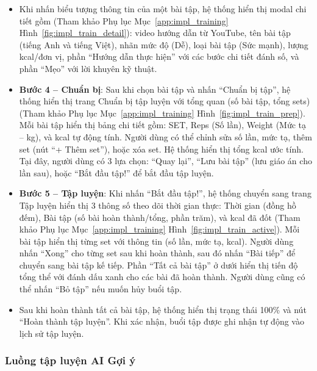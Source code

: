 \begin{itemize}
    \item Khi nhấn biểu tượng thông tin của một bài tập, hệ thống hiển thị modal chi tiết gồm (Tham khảo Phụ lục Mục~\ref{app:impl_training} Hình~\ref{fig:impl_train_detail}): video hướng dẫn từ YouTube, tên bài tập (tiếng Anh và tiếng Việt), nhãn mức độ (Dễ), loại bài tập (Sức mạnh), lượng kcal/đơn vị, phần ``Hướng dẫn thực hiện'' với các bước chi tiết đánh số, và phần ``Mẹo'' với lời khuyên kỹ thuật.


    \item \textbf{Bước 4 -- Chuẩn bị}: Sau khi chọn bài tập và nhấn ``Chuẩn bị tập'', hệ thống hiển thị trang Chuẩn bị tập luyện với tổng quan (số bài tập, tổng sets) (Tham khảo Phụ lục Mục~\ref{app:impl_training} Hình~\ref{fig:impl_train_prep}). Mỗi bài tập hiển thị bảng chi tiết gồm: SET, Reps (Số lần), Weight (Mức tạ -- kg), và kcal tự động tính. Người dùng có thể chỉnh sửa số lần, mức tạ, thêm set (nút ``+ Thêm set''), hoặc xóa set. Hệ thống hiển thị tổng kcal ước tính. Tại đây, người dùng có 3 lựa chọn: ``Quay lại'', ``Lưu bài tập'' (lưu giáo án cho lần sau), hoặc ``Bắt đầu tập!'' để bắt đầu tập luyện.


    \item \textbf{Bước 5 -- Tập luyện}: Khi nhấn ``Bắt đầu tập!'', hệ thống chuyển sang trang Tập luyện hiển thị 3 thông số theo dõi thời gian thực: Thời gian (đồng hồ đếm), Bài tập (số bài hoàn thành/tổng, phần trăm), và kcal đã đốt (Tham khảo Phụ lục Mục~\ref{app:impl_training} Hình~\ref{fig:impl_train_active}). Mỗi bài tập hiển thị từng set với thông tin (số lần, mức tạ, kcal). Người dùng nhấn ``Xong'' cho từng set sau khi hoàn thành, sau đó nhấn ``Bài tiếp'' để chuyển sang bài tập kế tiếp. Phần ``Tất cả bài tập'' ở dưới hiển thị tiến độ tổng thể với đánh dấu xanh cho các bài đã hoàn thành. Người dùng cũng có thể nhấn ``Bỏ tập'' nếu muốn hủy buổi tập.


    \item Sau khi hoàn thành tất cả bài tập, hệ thống hiển thị trạng thái 100\% và nút ``Hoàn thành tập luyện''. Khi xác nhận, buổi tập được ghi nhận tự động vào lịch sử tập luyện.

\end{itemize}

\subsubsection{Luồng tập luyện AI Gợi ý}


